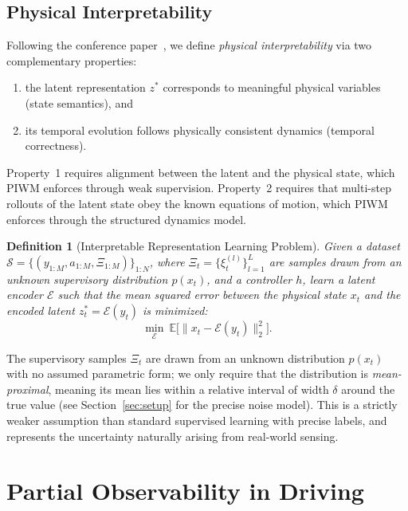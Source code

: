 \documentclass[preprint,12pt]{elsarticle}
\newtheorem{definition}{Definition}
\newcommand{\zstar}{z^{*}}   %
\begin{document}
\subsection{Physical Interpretability}

Following the conference paper~\cite{piwm_conf}, we define \emph{physical
interpretability} via two complementary properties:
\begin{enumerate}
    \item the latent representation $\zstar$ corresponds to meaningful physical
    variables (state semantics), and
    \item its temporal evolution follows physically consistent dynamics
    (temporal correctness).
\end{enumerate}
Property~1 requires alignment between the latent and the physical state, which
PIWM enforces through weak supervision.
Property~2 requires that multi-step rollouts of the latent state obey the known
equations of motion, which PIWM enforces through the structured dynamics model.

\begin{definition}[Interpretable Representation Learning Problem]
Given a dataset $\mathcal{S} = \{(y_{1:M}, a_{1:M}, \Xi_{1:M})\}_{1:N}$,
where $\Xi_t = \{\xi^{(l)}_t\}_{l=1}^L$ are samples drawn from an unknown
supervisory distribution $p(x_t)$, and a controller $h$, learn a latent encoder
$\mathcal{E}$ such that the mean squared error between the physical state $x_t$
and the encoded latent $\zstar_t = \mathcal{E}(y_t)$ is minimized:
\begin{equation}
    \min_{\mathcal{E}} \ \mathbb{E} \big[ \| x_t - \mathcal{E}(y_t) \|_2^2 \big].
\end{equation}
\end{definition}

The supervisory samples $\Xi_t$ are drawn from an unknown distribution $p(x_t)$
with no assumed parametric form; we only require that the distribution is
\emph{mean-proximal}, meaning its mean lies within a relative interval of width
$\delta$ around the true value (see Section~\ref{sec:setup} for the precise noise
model).
This is a strictly weaker assumption than standard supervised learning with
precise labels, and represents the uncertainty naturally arising from real-world
sensing.


\section{Partial Observability in Driving}\label{sec:problem}  %
\end{document}
